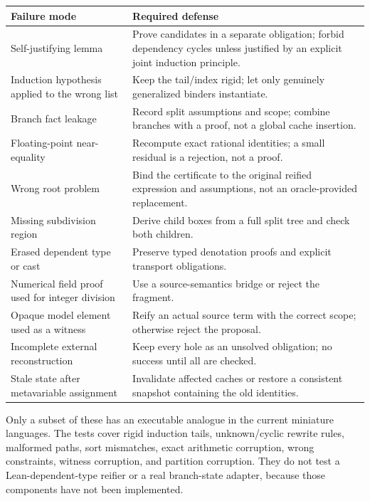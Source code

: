 \begin{longtable}{@{}>{\raggedright\arraybackslash}p{}>{\raggedright\arraybackslash}p{}@{}}
\toprule
Failure mode & Required defense \\
\midrule
\endhead
Self-justifying lemma & Prove candidates in a separate obligation; forbid dependency cycles unless justified by an explicit joint induction principle. \\
Induction hypothesis applied to the wrong list & Keep the tail/index rigid; let only genuinely generalized binders instantiate. \\
Branch fact leakage & Record split assumptions and scope; combine branches with a proof, not a global cache insertion. \\
Floating-point near-equality & Recompute exact rational identities; a small residual is a rejection, not a proof. \\
Wrong root problem & Bind the certificate to the original reified expression and assumptions, not an oracle-provided replacement. \\
Missing subdivision region & Derive child boxes from a full split tree and check both children. \\
Erased dependent type or cast & Preserve typed denotation proofs and explicit transport obligations. \\
Numerical field proof used for integer division & Use a source-semantics bridge or reject the fragment. \\
Opaque model element used as a witness & Reify an actual source term with the correct scope; otherwise reject the proposal. \\
Incomplete external reconstruction & Keep every hole as an unsolved obligation; no success until all are checked. \\
Stale state after metavariable assignment & Invalidate affected caches or restore a consistent snapshot containing the old identities. \\
\bottomrule
\end{longtable}

Only a subset of these has an executable analogue in the current miniature
languages. The tests cover rigid induction tails, unknown/cyclic rewrite
rules, malformed paths, sort mismatches, exact arithmetic corruption, wrong
constraints, witness corruption, and partition corruption. They do not test
a Lean-dependent-type reifier or a real branch-state adapter, because those
components have not been implemented.

